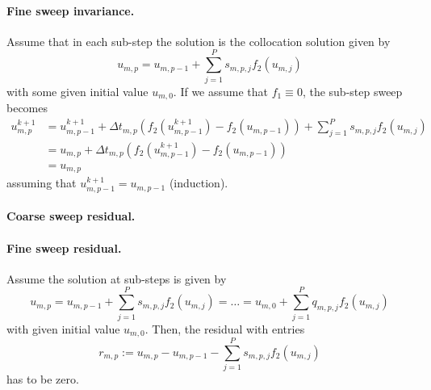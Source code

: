 \documentclass{article}
\begin{document}
\paragraph{Fine sweep invariance.}
Assume that in each sub-step the solution is the collocation solution given by
\begin{equation}
	u_{m,p} = u_{m,p-1} + \sum_{j=1}^{P} s_{m,p,j} f_2(u_{m,j})
\end{equation}
with some given initial value $u_{m,0}$.
If we assume that $f_1 \equiv 0$, the sub-step sweep becomes
\begin{align*}
	u^{k+1}_{m,p} &= u^{k+1}_{m,p-1} + \Delta t_{m,p} \left( f_2(u^{k+1}_{m,p-1}) - f_2(u_{m,p-1}) \right) + \sum_{j=1}^{P} s_{m,p,j} f_2(u_{m,j}) \\
				  &= u_{m,p}  + \Delta t_{m,p} \left( f_2(u^{k+1}_{m,p-1}) - f_2(u_{m,p-1}) \right) \\
				  &= u_{m,p}
\end{align*}
assuming that $u^{k+1}_{m,p-1} = u_{m,p-1}$ (induction).

\paragraph{Coarse sweep residual.}

\paragraph{Fine sweep residual.}
Assume the solution at sub-steps is given by
\begin{equation}
	u_{m,p} = u_{m,p-1} + \sum_{j=1}^{P} s_{m,p,j} f_2(u_{m,j}) = \ldots = u_{m,0} +  \sum_{j=1}^{P} q_{m,p,j} f_2(u_{m,j})
\end{equation}
with given initial value $u_{m,0}$.
Then, the residual with entries
\begin{equation}
	r_{m,p} := u_{m,p} - u_{m,p-1} - \sum_{j=1}^{P} s_{m,p,j} f_2(u_{m,j})
\end{equation}
has to be zero.
\end{document}
